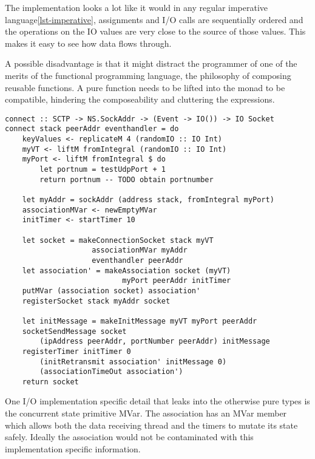 

The implementation looks a lot like it would in any regular imperative language\ref{lst-imperative}, assignments and I/O calls are sequentially ordered and the operations on the IO values are very close to the source of those values. This makes it easy to see how data flows through.

A possible disadvantage is that it might distract the programmer of one of the merits of the functional programming language, the philosophy of composing reusable functions. A pure function needs to be lifted into the monad to be compatible, hindering the composeability and cluttering the expressions.

\begin{lstlisting}[caption={The connect function looks imperative}, label={lst-imperative}]
connect :: SCTP -> NS.SockAddr -> (Event -> IO()) -> IO Socket
connect stack peerAddr eventhandler = do
    keyValues <- replicateM 4 (randomIO :: IO Int)
    myVT <- liftM fromIntegral (randomIO :: IO Int)
    myPort <- liftM fromIntegral $ do 
        let portnum = testUdpPort + 1
        return portnum -- TODO obtain portnumber

    let myAddr = sockAddr (address stack, fromIntegral myPort)
    associationMVar <- newEmptyMVar
    initTimer <- startTimer 10

    let socket = makeConnectionSocket stack myVT
                    associationMVar myAddr
                    eventhandler peerAddr
    let association' = makeAssociation socket (myVT) 
                           myPort peerAddr initTimer
    putMVar (association socket) association'
    registerSocket stack myAddr socket

    let initMessage = makeInitMessage myVT myPort peerAddr
    socketSendMessage socket 
        (ipAddress peerAddr, portNumber peerAddr) initMessage
    registerTimer initTimer 0 
        (initRetransmit association' initMessage 0)
        (associationTimeOut association')
    return socket
\end{lstlisting}

One I/O implementation specific detail that leaks into the otherwise pure types is the concurrent state primitive MVar. The association has an MVar member which allows both the data receiving thread and the timers to mutate its state safely. Ideally the association would not be contaminated with this implementation specific information.

